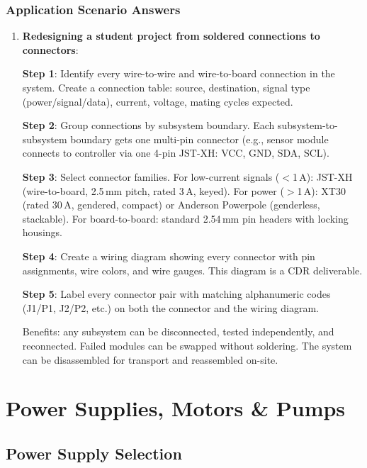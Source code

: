 \documentclass[11pt,letterpaper,twoside,openany]{book}
\begin{document}
\subsection{Application Scenario Answers}
\begin{enumerate}[leftmargin=1.5em, start=11]
\item \textbf{Redesigning a student project from soldered connections to connectors}:

\textbf{Step 1}: Identify every wire-to-wire and wire-to-board connection in the system. Create a connection table: source, destination, signal type (power/signal/data), current, voltage, mating cycles expected.

\textbf{Step 2}: Group connections by subsystem boundary. Each subsystem-to-subsystem boundary gets one multi-pin connector (e.g., sensor module connects to controller via one 4-pin JST-XH: VCC, GND, SDA, SCL).

\textbf{Step 3}: Select connector families. For low-current signals ($<$1\,A): JST-XH (wire-to-board, 2.5\,mm pitch, rated 3\,A, keyed). For power ($>$1\,A): XT30 (rated 30\,A, gendered, compact) or Anderson Powerpole (genderless, stackable). For board-to-board: standard 2.54\,mm pin headers with locking housings.

\textbf{Step 4}: Create a wiring diagram showing every connector with pin assignments, wire colors, and wire gauges. This diagram is a CDR deliverable.

\textbf{Step 5}: Label every connector pair with matching alphanumeric codes (J1/P1, J2/P2, etc.) on both the connector and the wiring diagram.

Benefits: any subsystem can be disconnected, tested independently, and reconnected. Failed modules can be swapped without soldering. The system can be disassembled for transport and reassembled on-site.
\end{enumerate}

\chapter{Power Supplies, Motors \& Pumps}

\vspace{1em}




\vspace{1em}

\section{Power Supply Selection}
\end{document}
